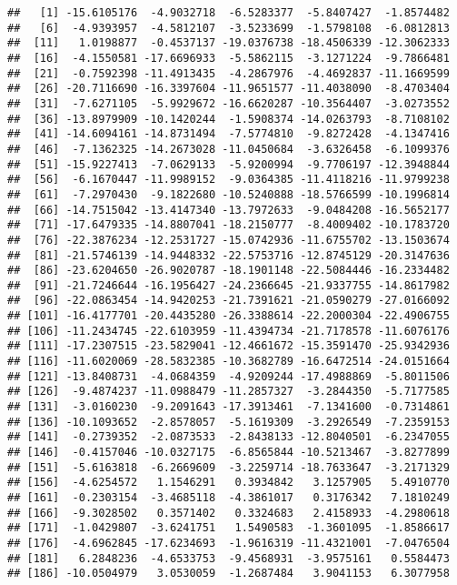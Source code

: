 \documentclass[]{article}
\begin{document}
\begin{verbatim}
##   [1] -15.6105176  -4.9032718  -6.5283377  -5.8407427  -1.8574482
##   [6]  -4.9393957  -4.5812107  -3.5233699  -1.5798108  -6.0812813
##  [11]   1.0198877  -0.4537137 -19.0376738 -18.4506339 -12.3062333
##  [16]  -4.1550581 -17.6696933  -5.5862115  -3.1271224  -9.7866481
##  [21]  -0.7592398 -11.4913435  -4.2867976  -4.4692837 -11.1669599
##  [26] -20.7116690 -16.3397604 -11.9651577 -11.4038090  -8.4703404
##  [31]  -7.6271105  -5.9929672 -16.6620287 -10.3564407  -3.0273552
##  [36] -13.8979909 -10.1420244  -1.5908374 -14.0263793  -8.7108102
##  [41] -14.6094161 -14.8731494  -7.5774810  -9.8272428  -4.1347416
##  [46]  -7.1362325 -14.2673028 -11.0450684  -3.6326458  -6.1099376
##  [51] -15.9227413  -7.0629133  -5.9200994  -9.7706197 -12.3948844
##  [56]  -6.1670447 -11.9989152  -9.0364385 -11.4118216 -11.9799238
##  [61]  -7.2970430  -9.1822680 -10.5240888 -18.5766599 -10.1996814
##  [66] -14.7515042 -13.4147340 -13.7972633  -9.0484208 -16.5652177
##  [71] -17.6479335 -14.8807041 -18.2150777  -8.4009402 -10.1783720
##  [76] -22.3876234 -12.2531727 -15.0742936 -11.6755702 -13.1503674
##  [81] -21.5746139 -14.9448332 -22.5753716 -12.8745129 -20.3147636
##  [86] -23.6204650 -26.9020787 -18.1901148 -22.5084446 -16.2334482
##  [91] -21.7246644 -16.1956427 -24.2366645 -21.9337755 -14.8617982
##  [96] -22.0863454 -14.9420253 -21.7391621 -21.0590279 -27.0166092
## [101] -16.4177701 -20.4435280 -26.3388614 -22.2000304 -22.4906755
## [106] -11.2434745 -22.6103959 -11.4394734 -21.7178578 -11.6076176
## [111] -17.2307515 -23.5829041 -12.4661672 -15.3591470 -25.9342936
## [116] -11.6020069 -28.5832385 -10.3682789 -16.6472514 -24.0151664
## [121] -13.8408731  -4.0684359  -4.9209244 -17.4988869  -5.8011506
## [126]  -9.4874237 -11.0988479 -11.2857327  -3.2844350  -5.7177585
## [131]  -3.0160230  -9.2091643 -17.3913461  -7.1341600  -0.7314861
## [136] -10.1093652  -2.8578057  -5.1619309  -3.2926549  -7.2359153
## [141]  -0.2739352  -2.0873533  -2.8438133 -12.8040501  -6.2347055
## [146]  -0.4157046 -10.0327175  -6.8565844 -10.5213467  -3.8277899
## [151]  -5.6163818  -6.2669609  -3.2259714 -18.7633647  -3.2171329
## [156]  -4.6254572   1.1546291   0.3934842   3.1257905   5.4910770
## [161]  -0.2303154  -3.4685118  -4.3861017   0.3176342   7.1810249
## [166]  -9.3028502   0.3571402   0.3324683   2.4158933  -4.2980618
## [171]  -1.0429807  -3.6241751   1.5490583  -1.3601095  -1.8586617
## [176]  -4.6962845 -17.6234693  -1.9616319 -11.4321001  -7.0476504
## [181]   6.2848236  -4.6533753  -9.4568931  -3.9575161   0.5584473
## [186] -10.0504979   3.0530059  -1.2687484   3.9041153   6.3077958

\end{verbatim}
\end{document}
